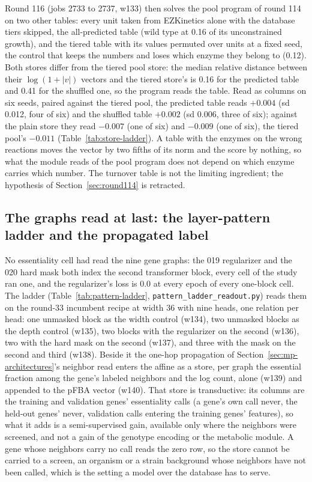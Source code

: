 Round 116 (jobs 2733 to 2737, w133) then solves the pool program of round 114 on two
other tables: every unit taken from EZKinetics alone with the database tiers skipped, the
all-predicted table (wild type at 0.16 of its unconstrained growth), and the tiered
table with its values permuted over units at a fixed seed, the control that keeps the
numbers and loses which enzyme they belong to (0.12). Both stores differ from the tiered
pool store: the median relative distance between their $\log(1+|v|)$ vectors and the
tiered store's is 0.16 for the predicted table and 0.41 for the shuffled one, so the
program reads the table. Read as columns on six seeds, paired against the tiered pool,
the predicted table reads $+0.004$ (sd 0.012, four of six) and the shuffled table
$+0.002$ (sd 0.006, three of six); against the plain store they read $-0.007$ (one of
six) and $-0.009$ (one of six), the tiered pool's $-0.011$
(Table~\ref{tab:store-ladder}). A table with the enzymes on the wrong reactions moves
the vector by two fifths of its norm and the score by nothing, so what the module reads
of the pool program does not depend on which enzyme carries which number. The turnover
table is not the limiting ingredient; the hypothesis of Section~\ref{sec:round114} is
retracted.

\subsection{The graphs read at last: the layer-pattern ladder and the propagated label}
\label{sec:pattern-ladder}

No essentiality cell had read the nine gene graphs: the 019 regularizer and the 020
hard mask both index the second transformer block, every cell of the study ran one, and
the regularizer's loss is 0.0 at every epoch of every one-block cell. The ladder
(Table~\ref{tab:pattern-ladder}, \texttt{pattern\_ladder\_readout.py}) reads them on
the round-33 incumbent recipe at width 36 with nine heads, one relation per head: one
unmasked block as the width control (w134), two unmasked blocks as the depth control
(w135), two blocks with the regularizer on the second (w136), two with the hard mask on
the second (w137), and three with the mask on the second and third (w138). Beside it
the one-hop propagation of Section~\ref{sec:mp-architectures}'s neighbor read enters
the affine as a store, per graph the essential fraction among the gene's labeled
neighbors and the log count, alone (w139) and appended to the pFBA vector (w140). That store is transductive: its
columns are the training and validation genes' essentiality calls (a gene's own call
never, the held-out genes' never, validation calls entering the training genes'
features), so what it adds is a semi-supervised gain, available only where the
neighbors were screened, and not a gain of the genotype encoding or the metabolic
module. A gene whose neighbors carry no call reads the zero row, so the store cannot
be carried to a screen, an organism or a strain background whose neighbors have not
been called, which is the setting a model over the database has to serve.

